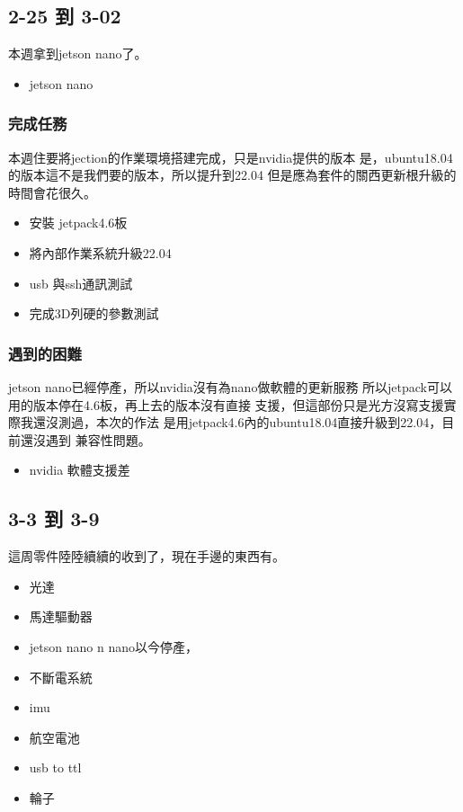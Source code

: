 
\subsection{2-25 到 3-02}
本週拿到jetson nano了。
\begin{itemize}
    \item jetson nano
\end{itemize}
\subsubsection{完成任務}
本週住要將jection的作業環境搭建完成，只是nvidia提供的版本
是，ubuntu18.04的版本這不是我們要的版本，所以提升到22.04
但是應為套件的關西更新根升級的時間會花很久。
\begin{itemize}
    \item 安裝 jetpack4.6板
    \item 將內部作業系統升級22.04
    \item usb 與ssh通訊測試
    \item 完成3D列硬的參數測試
\end{itemize}
\subsubsection{遇到的困難}
jetson nano已經停產，所以nvidia沒有為nano做軟體的更新服務
所以jetpack可以用的版本停在4.6板，再上去的版本沒有直接
支援，但這部份只是光方沒寫支援實際我還沒測過，本次的作法
是用jetpack4.6內的ubuntu18.04直接升級到22.04，目前還沒遇到
兼容性問題。
\begin{itemize}
    \item nvidia 軟體支援差
\end{itemize}

\subsection{3-3 到 3-9}
這周零件陸陸續續的收到了，現在手邊的東西有。

\begin{itemize}
    \item 光達
    \item 馬達驅動器
    \item jetson nano
        n nano以今停產，
    \item 不斷電系統
    \item imu 
    \item 航空電池
    \item usb to ttl
    \item 輪子
\end{itemize}

